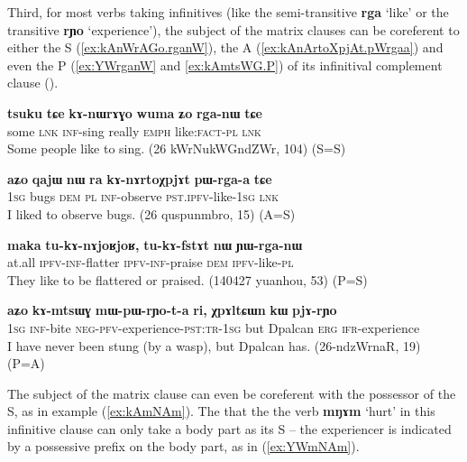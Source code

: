 \documentclass[oneside,a4paper,11pt]{article}
\newcommand{\ipa}[1]{\textbf{\phon#1}} %
\newcommand{\jpg}[2]{\ipa{#1} `#2'} %
\begin{document}
Third, for most verbs taking infinitives (like the semi-transitive \jpg{rga}{like} or the transitive \jpg{rɲo}{experience}), the subject of the matrix clauses can be coreferent to either the S  (\ref{ex:kAnWrAGo.rganW}), the A (\ref{ex:kAnArtoXpjAt.pWrgaa}) and even the P (\ref{ex:YWrganW} and \ref{ex:kAmtsWG.P})  of its infinitival complement clause (\citealt{jacques16relatives}).

 \begin{exe}
   \ex   \label{ex:kAnWrAGo.rganW} 
\gll
\ipa{tsuku}  	\ipa{tɕe}  	\ipa{kɤ-nɯrɤɣo}  	\ipa{wuma}  	\ipa{ʑo}  	\ipa{rga-nɯ}  	\ipa{tɕe}  \\
some \textsc{lnk} \textsc{inf}-sing really \textsc{emph} like:\textsc{fact-pl}  \textsc{lnk} \\
\glt Some people like to sing. (26 kWrNukWGndZWr, 104)  (S=S)
\end{exe}  
 
   \begin{exe}
   \ex   \label{ex:kAnArtoXpjAt.pWrgaa} 
\gll
  	\ipa{aʑo}  	\ipa{qajɯ}  	\ipa{nɯ} \ipa{ra}  	\ipa{kɤ-nɤrtoχpjɤt}  	\ipa{pɯ-rga-a}  	\ipa{tɕe}  	\\
  	\textsc{1sg} bugs \textsc{dem} \textsc{pl} \textsc{inf}-observe \textsc{pst.ipfv}-like-\textsc{1sg} \textsc{lnk}  \\
 \glt I liked to observe bugs. (26 quspunmbro, 15) (A=S)
     \end{exe}  
 
  \begin{exe}
   \ex   \label{ex:YWrganW} 
\gll
\ipa{maka}  	\ipa{tu-kɤ-nɤjoʁjoʁ,}  	\ipa{tu-kɤ-fstɤt}  	\ipa{nɯ}  	\ipa{ɲɯ-rga-nɯ}  \\
at.all \textsc{ipfv-inf}-flatter \textsc{ipfv-inf}-praise \textsc{dem} \textsc{ipfv}-like-\textsc{pl} \\
\glt They like to be flattered or praised. (140427 yuanhou, 53) (P=S)
    \end{exe}  
      \begin{exe}
   \ex   \label{ex:kAmtsWG.P} 
\gll 
\ipa{aʑo} 	\ipa{kɤ-mtsɯɣ} 	\ipa{mɯ-pɯ-rɲo-t-a} 	\ipa{ri,} 	\ipa{χpɤltɕɯn} 	\ipa{kɯ} 	\ipa{pjɤ-rɲo} 	
 \\
\textsc{1sg} \textsc{inf}-bite \textsc{neg-pfv}-experience-\textsc{pst:tr-1sg} but Dpalcan \textsc{erg} \textsc{ifr}-experience \\
\glt I have never been stung (by a wasp), but Dpalcan has. (26-ndzWrnaR, 19) (P=A)
    \end{exe}  

The subject of the matrix clause can even be coreferent with the possessor of the S, as in example (\ref{ex:kAmNAm}). The that the the verb \ipa{mŋɤm} `hurt' in this infinitive clause can only take a body part as its S -- the experiencer is indicated by a possessive prefix on the body part, as in (\ref{ex:YWmNAm}).
 
\end{document}
